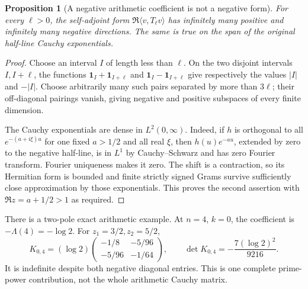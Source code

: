 \documentclass[11pt,a4paper]{article}
\newtheorem{proposition}[theorem]{Proposition}
\theoremstyle{definition}\newtheorem{definition}[theorem]{Definition}
\begin{document}
\begin{proposition}[A negative arithmetic coefficient is not a negative form]
For every $\ell>0$, the self-adjoint form
$\Re\langle v,T_\ell v\rangle$ has infinitely many positive and infinitely many negative directions. The same is true on the span of the original half-line Cauchy exponentials.
\end{proposition}
\begin{proof}
Choose an interval $I$ of length less than $\ell$. On the two disjoint intervals $I,I+\ell$, the functions $\mathbf1_I+\mathbf1_{I+\ell}$ and $\mathbf1_I-\mathbf1_{I+\ell}$ give respectively the values $|I|$ and $-|I|$. Choose arbitrarily many such pairs separated by more than $3\ell$; their off-diagonal pairings vanish, giving negative and positive subspaces of every finite dimension.

The Cauchy exponentials are dense in $L^2(0,\infty)$. Indeed, if $h$ is orthogonal to all $e^{-(a+i\xi)u}$ for one fixed $a>1/2$ and all real $\xi$, then $h(u)e^{-au}$, extended by zero to the negative half-line, is in $L^1$ by Cauchy--Schwarz and has zero Fourier transform. Fourier uniqueness makes it zero. The shift is a contraction, so its Hermitian form is bounded and finite strictly signed Grams survive sufficiently close approximation by those exponentials. This proves the second assertion with $\Re z=a+1/2>1$ as required.
\end{proof}

There is a two-pole exact arithmetic example. At $n=4$, $k=0$, the coefficient is $-\Lambda(4)=-\log2$. For $z_1=3/2,z_2=5/2$,
\begin{equation}
 K_{0,4}=(\log2)
 \begin{pmatrix}-1/8&-5/96\\-5/96&-1/64\end{pmatrix},
 \qquad\det K_{0,4}=-\frac{7(\log2)^2}{9216}.               \tag{PC7}\label{PC7}
\end{equation}
It is indefinite despite both negative diagonal entries. This is one complete prime-power contribution, not the whole arithmetic Cauchy matrix.
\end{document}
